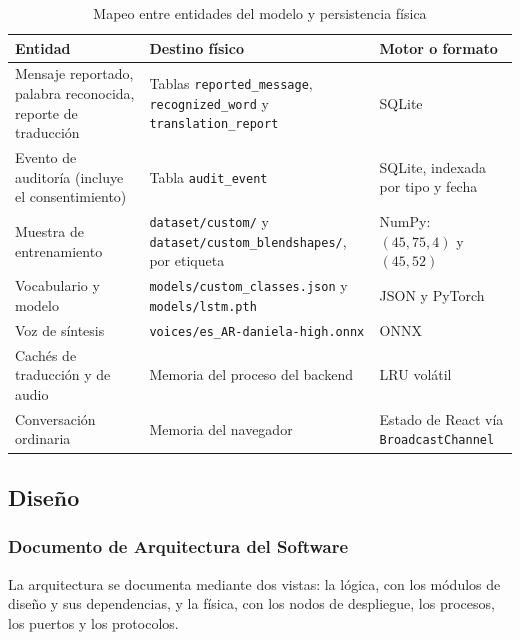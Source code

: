 \begin{table}[H]
  \centering
  \caption{Mapeo entre entidades del modelo y persistencia física}\label{tab:mapeo-fisico}
  \small
  \begin{tabularx}{\textwidth}{>{\raggedright\arraybackslash}p{4.2cm} >{\raggedright\arraybackslash}p{5.6cm} X}
    \toprule
    \textbf{Entidad} & \textbf{Destino físico} & \textbf{Motor o formato} \\
    \midrule
    Mensaje reportado, palabra reconocida, reporte de traducción & Tablas \texttt{reported\_message}, \texttt{recognized\_word} y \texttt{translation\_report} & SQLite \\
    Evento de auditoría (incluye el consentimiento) & Tabla \texttt{audit\_event} & SQLite, indexada por tipo y fecha \\
    Muestra de entrenamiento & \texttt{dataset/custom/} y \texttt{dataset/custom\_blendshapes/}, por etiqueta & NumPy: $(45, 75, 4)$ y $(45, 52)$ \\
    Vocabulario y modelo & \texttt{models/custom\_classes.json} y \texttt{models/lstm.pth} & JSON y PyTorch \\
    Voz de síntesis & \texttt{voices/\allowbreak es\_AR-\allowbreak daniela-\allowbreak high.onnx} & ONNX \\
    Cachés de traducción y de audio & Memoria del proceso del backend & LRU volátil \\
    Conversación ordinaria & Memoria del navegador & Estado de React vía \texttt{BroadcastChannel} \\
    \bottomrule
  \end{tabularx}
\end{table}

\subsection{Diseño}

\subsubsection{Documento de Arquitectura del Software}\label{sec:arquitectura}

La arquitectura se documenta mediante dos vistas: la lógica, con los módulos de diseño y sus dependencias, y la física, con los nodos de despliegue, los procesos, los puertos y los protocolos.

